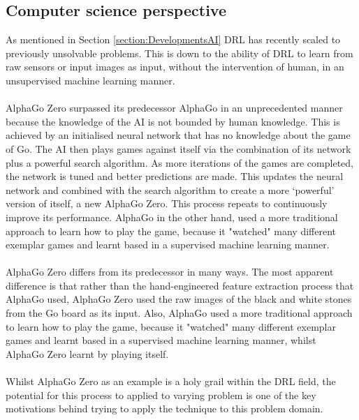 \documentclass[ %
                    author={Ashwinder Khurana},
                supervisor={Prof Dave Cliff},
                    degree={MEng},
                     title={The Deeply Reinforced Trader},
                  subtitle={},
                      type={enterprise},
                      year={2020} ]{dissertation}
\begin{document}
\vspace{0.5cm}
\subsection{Computer science perspective}
\label{subsection:Computer Science perspective}
\vspace{0.5cm} 
As mentioned in Section \ref{section:DevelopmentsAI} DRL has recently scaled to previously unsolvable problems. This is down to the ability of DRL to learn from raw sensors or input images as input, without the intervention of human, in an unsupervised machine learning manner. 
\\
\\
AlphaGo Zero surpassed its predecessor AlphaGo in an unprecedented manner because the knowledge of the AI is not bounded by human knowledge\cite{deepmind alpha go zero}. This is achieved by an initialised neural network that has no knowledge about the game of Go. The AI then plays games against itself via the combination of its network plus a powerful search algorithm. As more iterations of the games are completed, the network is tuned and better predictions are made. This updates the neural network and combined with the search algorithm to create a more \enquote*{powerful} version of itself, a new AlphaGo Zero. This process repeats to continuously improve its performance.
AlphaGo in the other hand, used a more traditional approach to learn how to play the game, because it "watched" many different exemplar games and learnt based in a supervised machine learning manner.
\\
\\
AlphaGo Zero differs from its predecessor in many ways. The most apparent difference is that rather than the hand-engineered feature extraction process that AlphaGo used, AlphaGo Zero used the raw images of the black and white stones from the Go board as its input. Also, AlphaGo used a more traditional approach to learn how to play the game, because it "watched" many different exemplar games and learnt based in a supervised machine learning manner, whilst AlphaGo Zero learnt by playing itself.
\\
\\
Whilst AlphaGo Zero as an example is a holy grail within the DRL field, the potential for this process to applied to varying problem is one of the key motivations behind trying to apply the technique to this problem domain.

\vspace{0.5cm}
\end{document}

